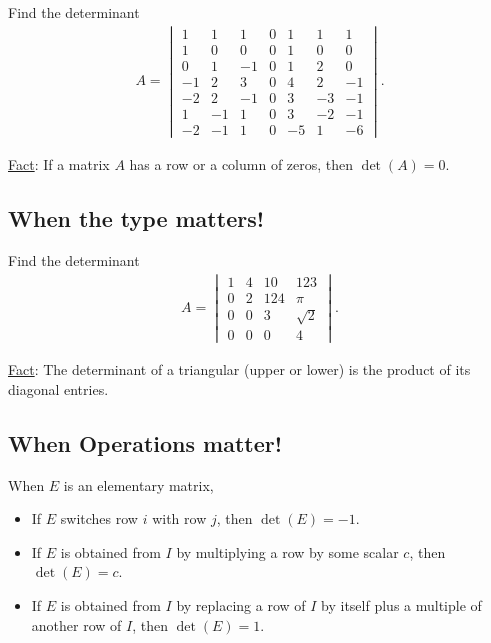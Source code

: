 \documentclass[12pt,a4paper]{article}
\newcounter{example}[section]
\begin{document}
	\begin{example}
	Find the determinant
		\begin{align*}
		A = \begin{vmatrix}
		1 & 1 & 1 & 0 & 1 & 1 & 1 \\
		1 & 0 & 0 & 0 & 1 & 0 & 0 \\
		0 & 1 & -1 & 0 & 1 & 2 & 0 \\
		-1 & 2 & 3 & 0 & 4 & 2 & -1 \\
		-2 & 2 & -1 & 0 & 3 & -3 & -1 \\
		1 & -1 & 1 & 0 & 3 & -2 & -1 \\
		-2 & -1 & 1 & 0 & -5 & 1 & -6
		\end{vmatrix}.
		\end{align*}
	\end{example}
	
	\vfill
	
	\noindent\underline{Fact}:
	If a matrix $A$ has a row or a column of zeros, then $\det (A) = 0$.
	
	\newpage
	
	\subsection{When the type matters!}
	
	\begin{example}
	Find the determinant
		\begin{align*}
		A = \begin{vmatrix}
		1 & 4 & 10 & 123 \\
		0 & 2 & 124 & \pi \\
		0 & 0 & 3 & \sqrt{2} \\
		0 & 0 & 0 & 4
		\end{vmatrix} .
		\end{align*}
	\end{example}
	
	\vfill
	
	\noindent\underline{Fact}:
	The determinant of a triangular (upper or lower) is the product of its diagonal entries.
	
	\newpage
	
	\subsection{When Operations matter!}
	
	When $E$ is an elementary matrix, 
	
		\begin{itemize}
		\item If $E$ switches row $i$ with row $j$, then $\det (E) = -1$.
		\item If $E$ is obtained from $I$ by multiplying a row by some scalar $c$, then $\det (E) = c$.
		\item If $E$ is obtained from $I$ by replacing a row of $I$ by itself plus a multiple of another row of $I$, then $\det (E) = 1$.
		\end{itemize}
	
\end{document}

